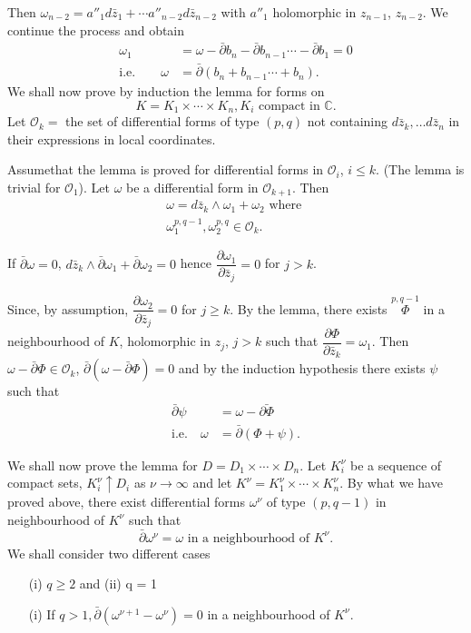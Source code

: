 Then $\omega_{n-2} = a''_1 d\bar{z}_1 + \cdots a''_{n-2}
d\bar{z}_{n-2}$ with $a''_1$ 
holomorphic in $z_{n-1}$, $z_{n-2}$. We continue the process and
obtain 
\begin{align*}
  \omega_1 & = \omega - \bar{\partial} b_n - \bar{\partial}b_{n-1}
  \cdots - \bar{\partial}b_1 = 0 \\ 
  \text{i.e.}\qquad  \omega &= \bar{\partial} (b_n + b_{n-1} \cdots + b_n).
\end{align*}
We shall now prove by induction the lemma for forms on 
$$
K = K_1 \times \cdots \times K_n, K_i \text{ compact in } \mathbb{C}.
$$
Let $\mathscr{O}_k = $ the set of differential forms of type $(p, q)$
not containing $d \bar{z}_k, \ldots d\bar{z}_n$ in their expressions
in local coordinates. 

Assume\pageoriginale that the lemma is proved for differential forms in
$\mathscr{O}_i$, $i \leq k$. (The lemma is trivial for
$\mathscr{O}_1$). Let $\omega$ be a differential form in
$\mathscr{O}_{k + 1}$. Then 
\begin{gather*}
  \omega  = d \bar{z}_k \wedge \omega_1 + \omega_2 \text{ where } \\
  \omega^{p,q-1}_1 , \omega^{p,q}_2 \in \mathscr{O}_k.
\end{gather*}

If $\bar{\partial} \omega = 0$, $d\bar{z}_k \wedge \bar{\partial}
\omega_1 + \bar{\partial} \omega_2 = 0$ hence $\dfrac{ \partial
  \omega_1}{\partial \bar{z}_j} = 0$ for $j > k$. 

Since, by assumption, $\dfrac{\partial \omega_2}{ \partial \bar{z}_j}
= 0$ for $j \geq k$. By the lemma, there exists  $\overset{p,
  q-1}\Phi$ in a neighbourhood of $K$, holomorphic in $z_j$, $j > k$
such that $\dfrac{\partial \Phi}{\partial \bar{z}_k} = \omega_1$. Then
$\omega - \bar{\partial} \Phi \in \mathscr{O}_k$, $\bar{\partial}
(\omega - \bar{\partial} \Phi) = 0$ and by the induction hypothesis
there exists $\psi$ such that 
\begin{align*}
  \bar{\partial} \psi & = \omega - \bar{\partial \Phi} \\
  \text{i.e.}\quad  \omega & = \bar{\partial} (\Phi + \psi ).
\end{align*}

We shall now prove the lemma for $D = D_1 \times \cdots \times
D_n$. Let $K^\nu_i$ be a sequence of compact sets, $K^\nu_i \uparrow
D_i$ as $\nu \to \infty$ and let $K^\nu = K^\nu_1 \times \cdots \times
K^\nu_n$. By what we have proved above, there exist differential forms
$\omega^\nu$ of type $(p, q-1)$ in neighbourhood of $K^\nu$ such that 
$$
\bar{\partial} \omega^\nu = \omega \text{ in a neighbourhood of } K^\nu.
$$
We shall consider two different cases
\begin{enumerate}
\item [(i)] $q \geq 2$ and (ii) q = 1
\item [(i)] If $q > 1, \bar{\partial} (\omega^{\nu+1} - \omega^\nu) = 0
  $ in a neighbourhood of $K^\nu$. 
\end{enumerate}


